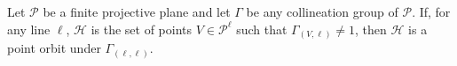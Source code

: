 Let $\mathcal{P}$ be a finite projective plane and let $\Gamma$ be any collineation group of $\mathcal{P}$. If, for any line $\ell$, $\mathcal{H}$ is the set of points $V \in \mathcal{P}^\ell$ such that $\Gamma_{(V,\ell)} \neq 1$, then $\mathcal{H}$ is a point orbit under $\Gamma_{(\ell,\ell)}$.
